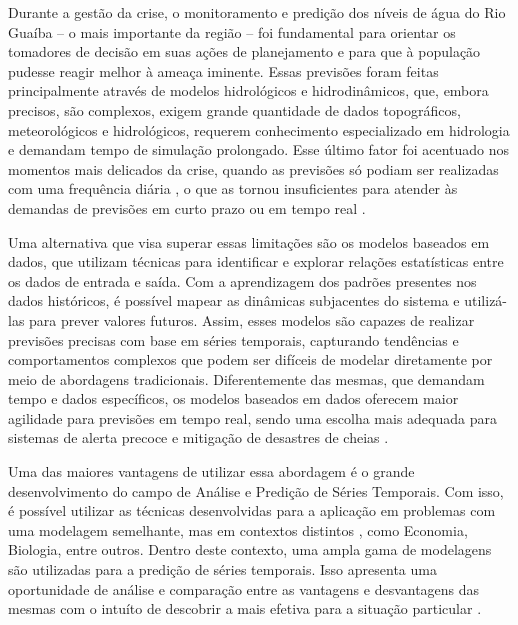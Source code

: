 Durante a gestão da crise, o monitoramento e predição dos níveis de água do Rio Guaíba – o mais importante da região –
foi fundamental para orientar os tomadores de decisão em suas ações de planejamento e para que à população pudesse
reagir melhor à ameaça iminente. Essas previsões foram feitas principalmente através de modelos hidrológicos e
hidrodinâmicos, que, embora precisos, são complexos, exigem grande quantidade de dados topográficos, meteorológicos e
hidrológicos, requerem conhecimento especializado em hidrologia e demandam tempo de simulação prolongado. Esse último
fator foi acentuado nos momentos mais delicados da crise, quando as previsões só podiam ser realizadas com uma
frequência diária \cite{iph}, o que as tornou insuficientes para atender às demandas de previsões em curto prazo ou em
tempo real \cite{atashi}.

Uma alternativa que visa superar essas limitações são os modelos baseados em dados, que utilizam técnicas para
identificar e explorar relações estatísticas entre os dados de entrada e saída. Com a aprendizagem dos padrões presentes
nos dados históricos, é possível mapear as dinâmicas subjacentes do sistema e utilizá-las para prever valores futuros.
Assim, esses modelos são capazes de realizar previsões precisas com base em séries temporais, capturando tendências e
comportamentos complexos que podem ser difíceis de modelar diretamente por meio de abordagens tradicionais.
Diferentemente das mesmas, que demandam tempo e dados específicos, os modelos baseados em dados oferecem maior agilidade
para previsões em tempo real, sendo uma escolha mais adequada para sistemas de alerta precoce e mitigação de desastres
de cheias \cite{ta}.

Uma das maiores vantagens de utilizar essa abordagem é o grande desenvolvimento do campo de Análise e Predição de Séries
Temporais. Com isso, é possível utilizar as técnicas desenvolvidas para a aplicação em problemas com uma modelagem
semelhante, mas em contextos distintos \cite{hyndman}, como Economia, Biologia, entre outros. Dentro deste contexto, uma
ampla gama de modelagens são utilizadas para a predição de séries temporais. Isso apresenta uma oportunidade de análise
e comparação entre as vantagens e desvantagens das mesmas com o intuíto de descobrir a mais efetiva para a situação
particular \cite{makridakis, morales}.

